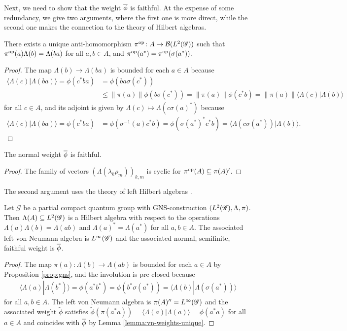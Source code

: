 Next, we need to show that the weight $\overline{\phi}$ is faithful. At the
expense of some redundancy, we give two arguments, where the first one
is more direct, while the second one makes the connection to the
theory of Hilbert algebras.
\begin{Lem}
  There exists a unique anti-homomorphism $\pi^{\operatorname{\mathrm{op}}} \colon A \to
  \mathcal{B}(L^{2}(\mathscr{G}))$ such that $\pi^{\operatorname{\mathrm{op}}}(a)\Lambda(b) =
  \Lambda(ba)$ for all $a,b\in A$, and $\pi^{\operatorname{\mathrm{op}}}(a^{*})  = \pi^{\operatorname{\mathrm{op}}}(\sigma(a^{*}))$.
\end{Lem}
\begin{proof}
The map $\Lambda(b) \to \Lambda(ba)$ is bounded for each $a\in A$ because
  \begin{align*}
    \langle \Lambda(c)|\Lambda(ba)\rangle
    =\phi(c^{*}ba)&=\phi(ba\sigma(c^{*})) \\ &\leq \|\pi(a)\|
    \phi(b\sigma(c^{*})) = \|\pi(a)\| \phi(c^{*}b) =\|\pi(a)\| \langle \Lambda(c)|\Lambda(b)\rangle
  \end{align*}
  for all $c \in A$, and its adjoint is given by $\Lambda(c)\mapsto
  \Lambda(c\sigma(a)^{*})$ because
  \begin{align*}
        \langle \Lambda(c)|\Lambda(ba)\rangle
    =\phi(c^{*}ba)&= \phi(\sigma^{-1}(a)c^{*}b)
    =\phi(\sigma(a^{*})^{*}c^{*}b) =
    \langle\Lambda(c\sigma(a^{*}))|\Lambda(b)\rangle. 
  \end{align*}
\end{proof}
\begin{Lem}
  The normal weight $\overline{\phi}$ is faithful.
\end{Lem}
\begin{proof}
  The family of vectors $(\Lambda(\lambda_{k}\rho_{m}))_{k,m}$ is
  cyclic for $\pi^{\operatorname{\mathrm{op}}}(A) \subseteq \pi(A)'$.
\end{proof}
The second argument uses the theory of left Hilbert algebras \cite{}.
\begin{Prop} \label{prop:hilbert-algebra} 
Let $\mathscr{G}$ be a partial compact quantum group with
GNS-construction $(L^{2}(\mathscr{G}),\Lambda,\pi)$. Then $\Lambda(A) \subseteq
L^{2}(\mathscr{G})$ is a Hilbert algebra with respect to the operations
  $\Lambda(a)\Lambda(b)=\Lambda(ab)$ and
  $\Lambda(a)^{*}= \Lambda(a^{*})$ for all $a,b\in A$. The associated
  left von Neumann algebra  is $L^{\infty}(\mathscr{G})$ and the associated normal,
  semifinite, faithful weight is $\overline{\phi}$.
\end{Prop}
\begin{proof}
  The map $\pi(a)\colon \Lambda(b) \to \Lambda(ab)$ is bounded for
  each $a \in A$ by Proposition \ref{prop:gns}, and the involution is
  pre-closed because
  \begin{align*}
    \langle \Lambda(a)|\Lambda(b^{*})\rangle = \phi(a^{*}b^{*}) =
    \phi(b^{*}\sigma(a^{*})) = \langle
    \Lambda(b)|\Lambda(\sigma(a^{*}))\rangle
  \end{align*}
  for all $a,b \in A$. The left von Neumann algebra is
  $\pi(A)''=L^{\infty}(\mathscr{G})$ and the associated weight $\tilde\phi$ satisfies
  $\tilde \phi(\pi(a^{*}a))=\langle\Lambda(a)|\Lambda(a)\rangle =
  \phi(a^{*}a)$ for all $a\in A$ and coincides with $\overline{\phi}$ by Lemma
  \ref{lemma:vn-weights-unique}.
\end{proof}
